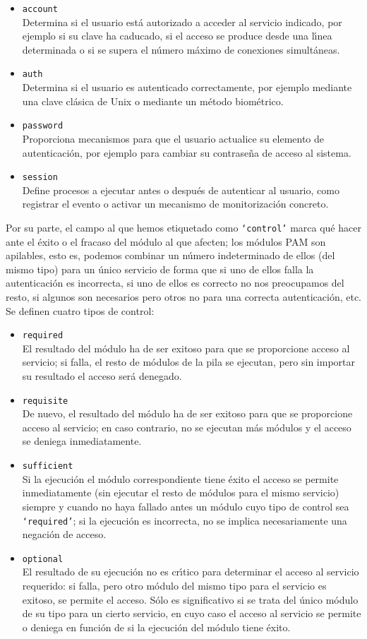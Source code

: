 \begin{itemize}
\item {\tt account}\\
Determina si el usuario est\'a autorizado a acceder al servicio indicado, por
ejemplo si su clave ha caducado, si el acceso se produce desde una l\'{\i}nea
determinada o si se supera el n\'umero m\'aximo de conexiones simult\'aneas.
\item {\tt auth}\\
Determina si el usuario es autenticado correctamente, por ejemplo mediante una
clave cl\'asica de Unix o mediante un m\'etodo biom\'etrico.
\item {\tt password}\\
Proporciona mecanismos para que el usuario actualice su elemento de 
autenticaci\'on, por ejemplo para cambiar su contrase\~na de acceso al sistema.
\item {\tt session}\\
Define procesos a ejecutar antes o despu\'es de autenticar al usuario, como
registrar el evento o activar un mecanismo de monitorizaci\'on concreto.
\end{itemize}
Por su parte, el campo al que hemos etiquetado como {\tt `control'} marca qu\'e
hacer ante el \'exito o el fracaso del m\'odulo al que afecten; los m\'odulos
PAM son apilables, esto es, podemos combinar un n\'umero indeterminado de ellos
(del mismo tipo) para un \'unico servicio de forma que si uno de ellos falla
la autenticaci\'on es incorrecta, si uno de ellos es correcto no nos preocupamos
del resto, si algunos son necesarios pero otros no para una correcta 
autenticaci\'on, etc. Se definen cuatro tipos de control:
\begin{itemize}
\item {\tt required}\\
El resultado del m\'odulo ha de ser exitoso para que se proporcione acceso al
servicio; si falla, el resto de m\'odulos de la pila se ejecutan, pero sin
importar su resultado el acceso ser\'a denegado.
\item {\tt requisite}\\
De nuevo, el resultado del m\'odulo ha de ser exitoso para que se proporcione 
acceso al servicio; en caso contrario, no se ejecutan m\'as m\'odulos y el 
acceso se deniega inmediatamente. 
\item {\tt sufficient}\\
Si la ejecuci\'on el m\'odulo correspondiente tiene \'exito el acceso se 
permite inmediatamente (sin ejecutar el resto de m\'odulos para el mismo
servicio) siempre y cuando no haya fallado antes un m\'odulo cuyo tipo de 
control sea {\tt `required'}; si la ejecuci\'on es incorrecta, no se implica 
necesariamente una negaci\'on de acceso. 
\item {\tt optional}\\
El resultado de su ejecuci\'on no es cr\'{\i}tico para determinar el acceso al
servicio requerido: si falla, pero otro m\'odulo del mismo tipo para el servicio
es exitoso, se permite el acceso. S\'olo es significativo si se trata del
\'unico m\'odulo de su tipo para un cierto servicio, en cuyo caso el acceso al
servicio se permite o deniega en funci\'on de si la ejecuci\'on del m\'odulo
tiene \'exito.
\end{itemize}
